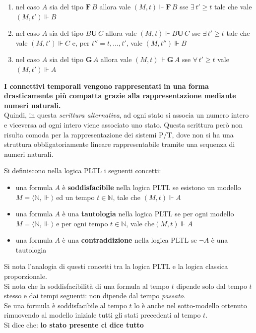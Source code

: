 \documentclass[a4paper,12pt, oneside]{book}
\begin{document}
\begin{definizione}
\begin{enumerate}
    \item nel caso $A$ sia del tipo $\mathbf{F}\,B$ allora vale $(M,t)\Vdash
    \mathbf{F}\,B$ sse $\exists\, t'\geq t$ tale che vale $(M,t')\Vdash B$
    \item nel caso $A$ sia del tipo $B\mathbf{U}\,C$ allora vale $(M,t)\Vdash
    B\mathbf{U}\,C$ sse $\exists\, t'\geq t$ tale che vale $(M,t')\Vdash C$ e,
    per $t''=t,\ldots,t'$, vale $(M,t'')\Vdash B$
    \item nel caso $A$ sia del tipo $\mathbf{G}\,A$ allora vale $(M,t)\Vdash
    \mathbf{G}\,A$ sse $\forall\, t'\geq t$ vale $(M,t')\Vdash A$
  \end{enumerate}
  \textbf{I connettivi temporali vengono rappresentati in una forma
    drasticamente più compatta grazie alla rappresentazione mediante numeri
    naturali.}\\ 
  Quindi, in questa \emph{scrittura alternativa}, ad ogni stato si associa un
  numero intero e viceversa ad ogni intero viene associato uno stato. Questa
  scrittura però non risulta comoda per la rappresentazione dei sistemi P/T,
  dove non si ha una struttura obbligatoriamente lineare rappresentabile tramite
  una sequenza di numeri naturali.
\end{definizione}
\begin{definizione}
  Si definiscono nella logica PLTL i seguenti concetti:
  \begin{itemize}
    \item una formula $A$ è \textbf{soddisfacibile} nella logica PLTL se
    esistono un modello $M=\langle \mathbb{N},\Vdash\rangle$ ed un tempo
    $t\in\mathbb{N}$, tale che $(M,t)\Vdash A$
    \item una formula $A$ è una \textbf{tautologia} nella logica PLTL se per
    ogni modello $M=\langle \mathbb{N},\Vdash\rangle$ e per ogni tempo
    $t\in\mathbb{N}$, vale che$ (M,t)\Vdash A$
    \item una formula $A$ è una \textbf{contraddizione} nella logica PLTL se
    $\neg A$ è una tautologia
  \end{itemize}
  Si nota l'analogia di questi concetti tra la logica PLTL e la logica classica
  proporzionale.\\
  Si nota che la soddisfacibilità di una formula al tempo $t$ dipende solo dal
  tempo $t$ stesso e dai tempi seguenti: non dipende dal tempo \emph{passato}.\\
  Se una formula è soddisfacibile al tempo $t$ lo è anche nel sotto-modello
  ottenuto rimuovendo al modello iniziale tutti gli stati precedenti al tempo
  $t$.\\
  Si dice che: \textbf{lo stato presente ci dice tutto}
\end{definizione}
\end{document}
